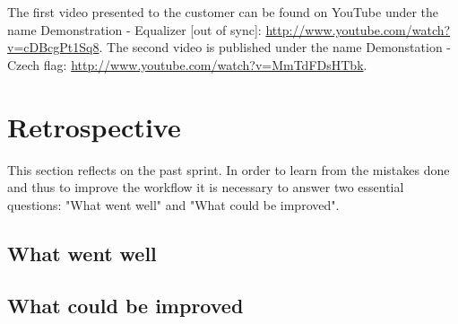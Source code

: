 The first video presented to the customer can be found on YouTube under the name Demonstration - Equalizer [out of sync]: \url{http://www.youtube.com/watch?v=cDBcgPt1Sq8}. The second video is published under the name Demonstation - Czech flag: \url{http://www.youtube.com/watch?v=MmTdFDsHTbk}.

\section{Retrospective}
This section reflects on the past sprint. In order to learn from the mistakes done and thus to improve the workflow it is necessary to answer two essential questions: "What went well" and "What could be improved".

\subsection{What went well}
\subsection{What could be improved}

